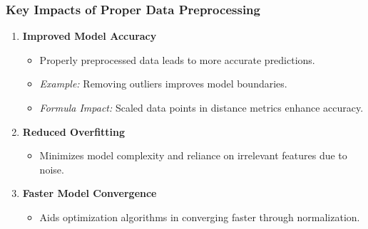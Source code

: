 \documentclass[aspectratio=169]{beamer}
\begin{document}
\begin{frame}[fragile]
    \frametitle{Key Impacts of Proper Data Preprocessing}
    \begin{enumerate}
        \item \textbf{Improved Model Accuracy}
            \begin{itemize}
                \item Properly preprocessed data leads to more accurate predictions.
                \item \textit{Example:} Removing outliers improves model boundaries.
                \item \textit{Formula Impact:} Scaled data points in distance metrics enhance accuracy.
            \end{itemize}
        \item \textbf{Reduced Overfitting}
            \begin{itemize}
                \item Minimizes model complexity and reliance on irrelevant features due to noise.
            \end{itemize}
        \item \textbf{Faster Model Convergence}
            \begin{itemize}
                \item Aids optimization algorithms in converging faster through normalization.
            \end{itemize}
    \end{enumerate}
\end{frame}
\end{document}

